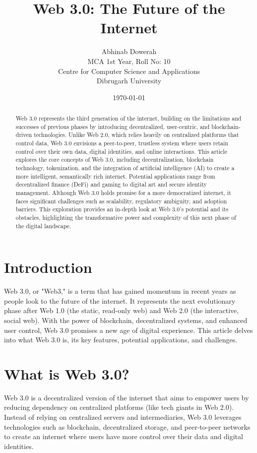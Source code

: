 \documentclass[12pt]{article}
\title{\textbf{Web 3.0: The Future of the Internet}}
\author{Abhinab Dowerah \\ MCA 1st Year, Roll No: 10 \\Centre for Computer Science and Applications \\ Dibrugarh University}
\date{\today}
\begin{document}
\maketitle

\begin{abstract}
Web 3.0 represents the third generation of the internet, building on the limitations and successes of previous phases by introducing decentralized, user-centric, and blockchain-driven technologies. Unlike Web 2.0, which relies heavily on centralized platforms that control data, Web 3.0 envisions a peer-to-peer, trustless system where users retain control over their own data, digital identities, and online interactions. This article explores the core concepts of Web 3.0, including decentralization, blockchain technology, tokenization, and the integration of artificial intelligence (AI) to create a more intelligent, semantically rich internet. Potential applications range from decentralized finance (DeFi) and gaming to digital art and secure identity management. Although Web 3.0 holds promise for a more democratized internet, it faces significant challenges such as scalability, regulatory ambiguity, and adoption barriers. This exploration provides an in-depth look at Web 3.0's potential and its obstacles, highlighting the transformative power and complexity of this next phase of the digital landscape.
\end{abstract}

\section{Introduction}
Web 3.0, or "Web3," is a term that has gained momentum in recent years as people look to the future of the internet. It represents the next evolutionary phase after Web 1.0 (the static, read-only web) and Web 2.0 (the interactive, social web). With the power of blockchain, decentralized systems, and enhanced user control, Web 3.0 promises a new age of digital experience. This article delves into what Web 3.0 is, its key features, potential applications, and challenges.

\section{What is Web 3.0?}
Web 3.0 is a decentralized version of the internet that aims to empower users by reducing dependency on centralized platforms (like tech giants in Web 2.0). Instead of relying on centralized servers and intermediaries, Web 3.0 leverages technologies such as blockchain, decentralized storage, and peer-to-peer networks to create an internet where users have more control over their data and digital identities.
\end{document}
